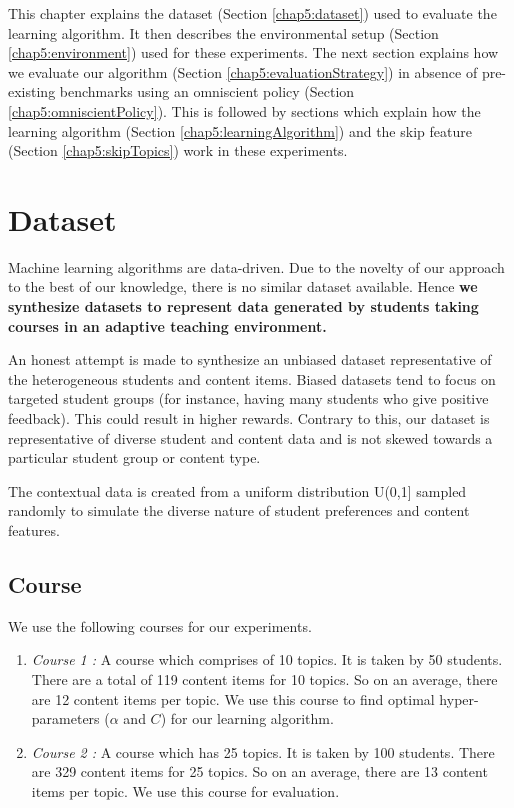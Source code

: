 \label{chapter:Exp}

This chapter explains the dataset (Section \ref{chap5:dataset}) used to evaluate the learning algorithm. It then describes the environmental setup (Section \ref{chap5:environment}) used for these experiments. The next section explains how we evaluate our algorithm (Section \ref{chap5:evaluationStrategy}) in absence of pre-existing benchmarks using an omniscient policy (Section \ref{chap5:omniscientPolicy}). This is followed by sections which explain how the learning algorithm (Section \ref{chap5:learningAlgorithm}) and the skip feature (Section \ref{chap5:skipTopics}) work in these experiments.

\section{Dataset \label{chap5:dataset}}

Machine learning algorithms are data-driven. Due to the novelty of our approach to the best of our knowledge, there is no similar dataset available. Hence \textbf{we synthesize datasets to represent data generated by students taking courses in an adaptive teaching environment.} \par

An honest attempt is made to synthesize an unbiased dataset representative of the heterogeneous students and content items. Biased datasets tend to focus on targeted student groups (for instance, having many students who give positive feedback). This could result in higher rewards. Contrary to this, our dataset is representative of diverse student and content data and is not skewed towards a particular student group or content type. 

The contextual data is created from a uniform distribution U(0,1] sampled randomly to simulate the diverse nature of student preferences and content features.  \par

\subsection{Course \label{chap5:courses}}

We use the following courses for our experiments. 

\begin{enumerate}
\item \textit{Course 1 :} A course which comprises of 10 topics. It is taken by 50 students. There are a total of 119 content items for 10 topics. So on an average, there are 12 content items per topic. We use this course to find optimal hyper-parameters ($\alpha$ and $C$) for our learning algorithm.

\item \textit{Course 2 :} A course which has 25 topics. It is taken by 100 students. There are 329 content items for 25 topics. So on an average, there are 13 content items per topic. We use this course for evaluation.\par

\end{enumerate}

